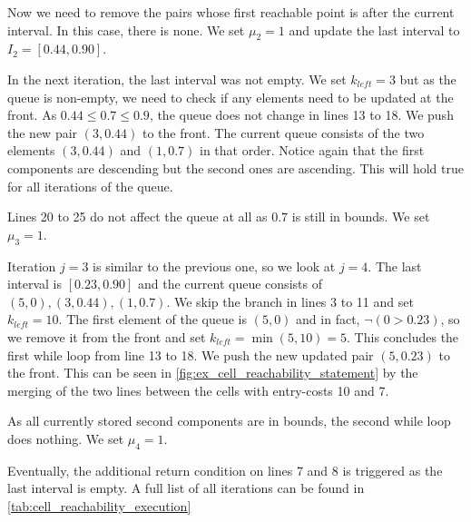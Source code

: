 Now we need to remove the pairs whose first reachable point is after the current interval. In this case, there is none. We set \(\mu_2 = 1\) and update the last interval to \(I_2 = [0.44, 0.90]\).

In the next iteration, the last interval was not empty. We set \(k_{left} = 3\) but as the queue is non-empty, we need to check if any elements need to be updated at the front. As \(0.44 \leq 0.7 \leq 0.9\), the queue does not change in lines 13 to 18. We push the new pair \((3, 0.44)\) to the front. The current queue consists of the two elements \((3, 0.44)\) and \((1, 0.7)\) in that order. Notice again that the first components are descending but the second ones are ascending. This will hold true for all iterations of the queue. 

Lines 20 to 25 do not affect the queue at all as \(0.7\) is still in bounds. We set \(\mu_3 = 1\). 

Iteration \(j = 3\) is similar to the previous one, so we look at \(j = 4\). The last interval is \([0.23, 0.90]\) and the current queue consists of \((5, 0), (3, 0.44), (1, 0.7)\). We skip the branch in lines 3 to 11 and set \(k_{left} = 10\). The first element of the queue is \((5, 0)\) and in fact, \(\lnot(0 > 0.23)\), so we remove it from the front and set \(k_{left} = \min(5, 10) = 5\). This concludes the first while loop from line 13 to 18. We push the new updated pair \((5, 0.23)\) to the front. This can be seen in \cref{fig:ex_cell_reachability_statement} by the merging of the two lines between the cells with entry-costs 10 and 7. 

As all currently stored second components are in bounds, the second while loop does nothing. We set \(\mu_4 = 1\).

Eventually, the additional return condition on lines 7 and 8 is triggered as the last interval is empty. A full list of all iterations can be found in \cref{tab:cell_reachability_execution}

